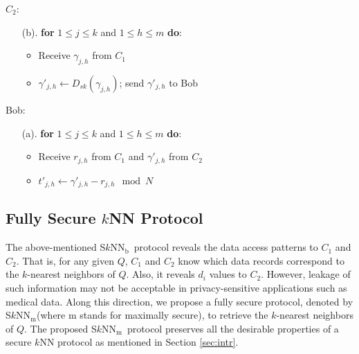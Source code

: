 \documentclass{article}
\newcommand{\sknnb}{S$k$NN$_\textrm{b}$}
\newcommand{\sknnm}{S$k$NN$_\textrm{m}$}
\begin{document}
\begin{algorithm}[!htbp]
\begin{algorithmic}[1]
\STATE $C_2$:
\begin{enumerate}\itemsep=0pt
\item[(b).] \textbf{for} $1 \le j \le k$ and $1 \le h \le m$ \textbf{do}:
       \begin{itemize}
                \item Receive $\gamma_{j,h}$ from $C_1$
                \item $ \gamma'_{j,h} \gets D_{sk}(\gamma_{j,h})$; send $\gamma'_{j,h}$ to Bob 
       \end{itemize}           
 \end{enumerate}

\STATE  Bob:
\begin{enumerate}\itemsep=0pt
     \item[(a).] \textbf{for} $1 \le j \le k$ and $1 \le h \le m$ \textbf{do}:
       \begin{itemize}
                \item Receive $r_{j,h}$ from $C_1$ and $\gamma'_{j,h}$ from $C_2$     
                \item $t'_{j,h} \gets \gamma'_{j,h} - r_{j,h} \mod N$
       \end{itemize}           
\end{enumerate}

\end{algorithmic}
\caption{S$k$NN$_\textrm{b}(E_{pk}(T), Q) \rightarrow \langle t'_1,\dots,t'_k \rangle$}
\label{alg:basic}
\end{algorithm} 

\subsection{Fully Secure $k$NN Protocol}\label{sec:method}
The above-mentioned \sknnb~protocol reveals the data access patterns to $C_1$ and $C_2$. 
That is, for any given $Q$, $C_1$  and $C_2$ know which data records 
correspond to the $k$-nearest neighbors of $Q$. Also, 
it reveals $d_i$ values to $C_2$. However, leakage of such information may not be acceptable 
in privacy-sensitive applications such as medical data. Along this direction, 
we propose a fully secure protocol, denoted by \sknnm (where m stands for maximally secure), to retrieve 
the $k$-nearest neighbors of $Q$. The proposed \sknnm~protocol preserves all 
the desirable properties of a secure $k$NN protocol as mentioned in Section \ref{sec:intr}.
\end{document}

